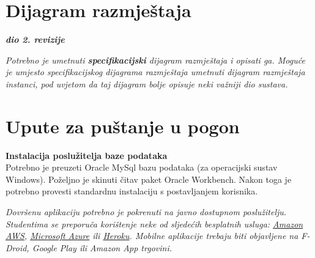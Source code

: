 			\eject 
		
		
		\section{Dijagram razmještaja}
			
			\textbf{\textit{dio 2. revizije}}
			
			 \textit{Potrebno je umetnuti \textbf{specifikacijski} dijagram razmještaja i opisati ga. Moguće je umjesto specifikacijskog dijagrama razmještaja umetnuti dijagram razmještaja instanci, pod uvjetom da taj dijagram bolje opisuje neki važniji dio sustava.}
			
			\eject 
		
		\section{Upute za puštanje u pogon}
		
			\textbf{Instalacija poslužitelja baze podataka}\\
		
			 Potrebno je preuzeti Oracle MySql bazu podataka (za operacijski sustav Windows).
			 Poželjno je skinuti čitav paket Oracle Workbench. Nakon toga je potrebno provesti standardnu instalaciju s postavljanjem korisnika.
			
			
			 \textit{Dovršenu aplikaciju potrebno je pokrenuti na javno dostupnom poslužitelju. Studentima se preporuča korištenje neke od sljedećih besplatnih usluga: \href{https://aws.amazon.com/}{Amazon AWS}, \href{https://azure.microsoft.com/en-us/}{Microsoft Azure} ili \href{https://www.heroku.com/}{Heroku}. Mobilne aplikacije trebaju biti objavljene na F-Droid, Google Play ili Amazon App trgovini.}
			
			
			\eject 